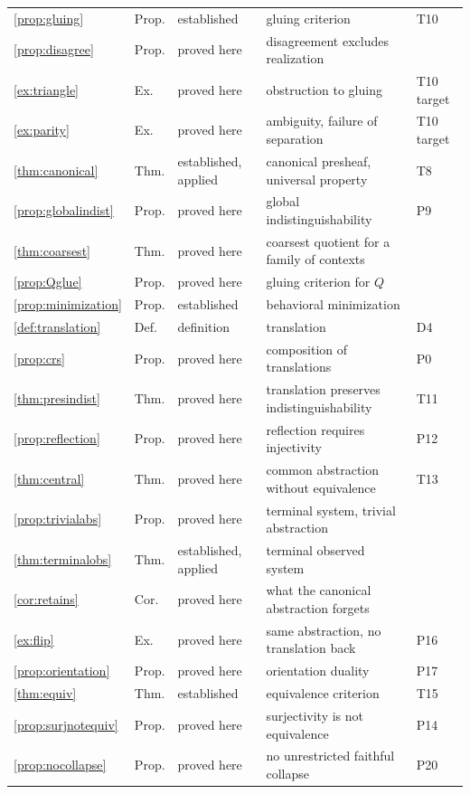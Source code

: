 \documentclass[11pt]{article}
\theoremstyle{definition}
\theoremstyle{remark}
\begin{document}
\begin{center}
\begin{longtable}{lllp{5.3cm}l}
\ref{prop:gluing} & Prop. & established & gluing criterion & T10\\
\ref{prop:disagree} & Prop. & proved here & disagreement excludes realization & \\
\ref{ex:triangle} & Ex. & proved here & obstruction to gluing & T10 target\\
\ref{ex:parity} & Ex. & proved here & ambiguity, failure of separation & T10 target\\
\ref{thm:canonical} & Thm. & established, applied & canonical presheaf, universal property & T8\\
\ref{prop:globalindist} & Prop. & proved here & global indistinguishability & P9\\
\ref{thm:coarsest} & Thm. & proved here & coarsest quotient for a family of contexts & \\
\ref{prop:Qglue} & Prop. & proved here & gluing criterion for $Q$ & \\
\ref{prop:minimization} & Prop. & established & behavioral minimization & \\
\ref{def:translation} & Def. & definition & translation & D4\\
\ref{prop:crs} & Prop. & proved here & composition of translations & P0\\
\ref{thm:presindist} & Thm. & proved here & translation preserves indistinguishability & T11\\
\ref{prop:reflection} & Prop. & proved here & reflection requires injectivity & P12\\
\ref{thm:central} & Thm. & proved here & common abstraction without equivalence & T13\\
\ref{prop:trivialabs} & Prop. & proved here & terminal system, trivial abstraction & \\
\ref{thm:terminalobs} & Thm. & established, applied & terminal observed system & \\
\ref{cor:retains} & Cor. & proved here & what the canonical abstraction forgets & \\
\ref{ex:flip} & Ex. & proved here & same abstraction, no translation back & P16\\
\ref{prop:orientation} & Prop. & proved here & orientation duality & P17\\
\ref{thm:equiv} & Thm. & established & equivalence criterion & T15\\
\ref{prop:surjnotequiv} & Prop. & proved here & surjectivity is not equivalence & P14\\
\ref{prop:nocollapse} & Prop. & proved here & no unrestricted faithful collapse & P20\\

\end{longtable}
\end{center}
\end{document}
